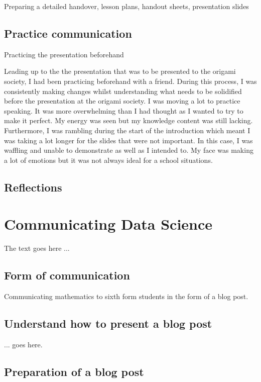 \documentclass[12pt, a4paper,oneside]{book}
\numberwithin{equation}{section}
\begin{document}
Preparing a detailed handover, lesson plans, handout sheets, presentation slides

\section{Practice communication}\label{sec:x.x}

Practicing the presentation beforehand

Leading up to the the presentation that was to be presented to the origami society, I had been practicing beforehand with a friend. During this process, I was consistently making changes whilst understanding what needs to be solidified before the presentation at the origami society. I was moving a lot to practice speaking. It was more overwhelming than I had thought as I wanted to try to make it perfect. My energy was seen but my knowledge content was still lacking. Furthermore, I was rambling during the start of the introduction which meant I was taking a lot longer for the slides that were not important. In this case, I was waffling and unable to demonstrate as well as I intended to. My face was making a lot of emotions but it was not always ideal for a school situations.

\section{Reflections}\label{sec:x.x}

\chapter{Communicating Data Science}\label{ch:x}

The text goes here ...

\section{Form of communication}\label{sec:x.x}

Communicating mathematics to sixth form students in the form of a blog post.

\section{Understand how to present a blog post}\label{sec:x.x}

... goes here.

\section{Preparation of a blog post}\label{sec:x.x}
\end{document}
